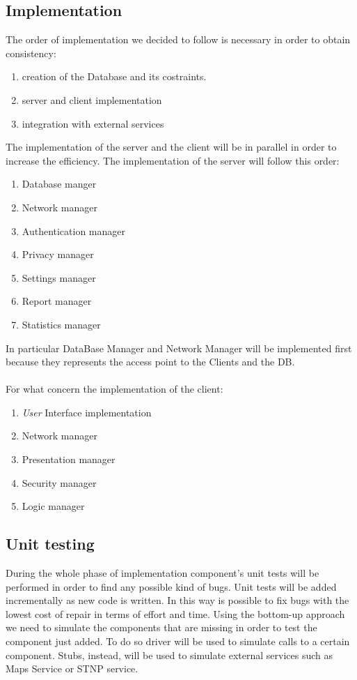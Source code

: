 \documentclass{article}
\begin{document}
\subsection{Implementation}
The order of implementation we decided to follow is necessary in order to obtain consistency:
\begin{enumerate}
    \item creation of the Database and its costraints.
    \item server and client implementation
    \item integration with external services
\end{enumerate}
The implementation of the server and the client will be in parallel in order to increase the efficiency.
The implementation of the server will follow this order:
\begin{enumerate}
    \item Database manger
    \item Network manager 
    \item Authentication manager 
    \item Privacy manager
    \item Settings manager
    \item Report manager
    \item Statistics manager
\end{enumerate}
In particular DataBase Manager and Network Manager will be implemented first because they represents the access 
point to the Clients and the DB. 
\\
\\
For what concern the implementation of the client:
\begin{enumerate}
    \item \textit{User} Interface implementation
    \item Network manager
    \item Presentation manager
    \item Security manager
    \item Logic manager
\end{enumerate}
\subsection{Unit testing}
During the whole phase of implementation component's unit tests will be performed in order to find any possible kind of bugs.
Unit tests will be added incrementally as new code is written. In this way is possible to fix bugs with the lowest cost of 
repair in terms of effort and time. Using the bottom-up approach we need to simulate the components that are missing in order
to test the component just added. To do so driver will be used to simulate calls to a certain component. Stubs, instead, will be 
used to simulate external services such as Maps Service or STNP service.    
\end{document}
